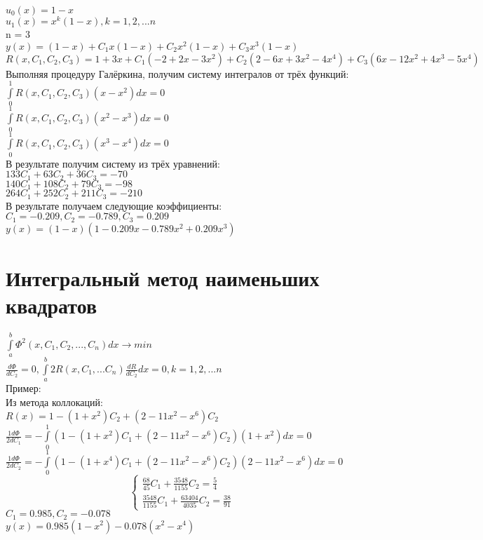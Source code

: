 $u_{0}(x) = 1 - x$\\
$u_{1}(x) = x^{k}(1 - x), k = 1, 2, ... n$\\
n = 3\\
$y(x) = (1 - x) + C_{1} x(1 - x) + C_{2} x^{2} (1 - x) + C_{3} x^{3} (1 - x)$\\
$R(x, C_{1}, C_{2}, C_{3}) = 1 + 3x + C_{1} (-2 + 2x - 3x^{2}) + C_{2} (2 - 6x + 3x^{2} - 4x^{4}) + C_{3} (6x - 12x^{2} + 4x^{3} - 5x^{4})$\\
Выполняя процедуру Галёркина, получим систему интегралов от трёх функций:\\
$\int\limits_{0}^{1} R(x, C_{1}, C_{2}, C_{3}) (x - x^{2}) dx = 0$\\
$\int\limits_{0}^{1} R(x, C_{1}, C_{2}, C_{3}) (x^{2} - x^{3}) dx = 0$\\
$\int\limits_{0}^{1} R(x, C_{1}, C_{2}, C_{3}) (x^{3} - x^{4}) dx = 0$\\
В результате получим систему из трёх уравнений:\\
$133 C_{1} + 63 C_{2} + 36 C_{3} = -70$\\
$140 C_{1} + 108 C_{2} + 79 C_{3} = -98$\\
$264 C_{1} + 252 C_{2} + 211 C_{3} = -210$\\
В результате получаем следующие коэффициенты: $C_{1} = -0.209, C_{2} = -0.789, C_{3} = 0.209$\\
$y(x) = (1 - x)(1 - 0.209x - 0.789 x^{2} + 0.209 x^{3})$\\

\section{Интегральный метод наименьших квадратов}
$\int\limits_{a}^{b} \Phi^{2}(x, C_{1}, C_{2}, ..., C_{n}) dx  \rightarrow min$\\
$\frac{d\Phi}{dC_{2}} = 0, \int\limits_{a}^{b} 2R(x, C_{1}, ... C_{n}) \frac{dR}{dC_{2}} dx = 0, k = 1, 2, ... n$\\
Пример:\\
Из метода коллокаций:\\
$R(x) = 1 - (1 + x^{2}) C_{2} + (2 - 11x^{2} -x^{6})C_{2}$\\
$\frac{1 d\Phi}{2 dC_{1}} = -\int\limits_{0}^{1} (1 - (1 + x^{2}) C_{1} + (2 - 11x^{2} -x^{6})C_{2}) (1 + x^{2}) dx = 0$\\
$\frac{1 d\Phi}{2 dC_{2}} = -\int\limits_{0}^{1} (1 - (1 + x^{4}) C_{1} + (2 - 11x^{2} -x^{6})C_{2}) (2 - 11x^{2} - x^{6}) dx = 0$\\
\begin{equation}
\begin{cases}
\frac{68}{45} C_{1} + \frac{3548}{1155} C_{2} = \frac{5}{4}\\
\frac{3548}{1155} C_{1} + \frac{63404}{4035} C_{2} = \frac{38}{91}
\end{cases}
\end{equation}
$C_{1} = 0.985, C_{2} = -0.078$\\
$y(x) = 0.985(1 - x^{2}) - 0.078(x^{2} - x^{4})$

